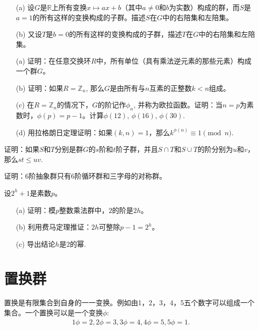 \begin{problemset}
\item \begin{enumerate}
\item[(a)] 设$G$是$\mathbb{R}$上所有变换$x \mapsto ax+b$（其中$a \neq 0$和$b$为实数）构成的群，而$S$是$a=1$的所有这样的变换构成的子群。描述$S$在$G$中的右陪集和左陪集。
\item[(b)] 又设$T$是$b=0$的所有这样的变换构成的子群，描述$T$在$G$中的右陪集和左陪集。
\end{enumerate}

\item \begin{enumerate}
\item[(a)] 证明：在任意交换环$R$中，所有单位（具有乘法逆元素的那些元素）构成一个群$G$。
\item[(b)] 证明：如果$R = \mathbb{Z}_n$, 那么$G$是由所有与$n$互素的正整数$k < n$组成。
\item[(c)] 在$R = \mathbb{Z}_n$的情况下，$G$的阶记作$\phi_n$, 并称为欧拉函数。证明：当$n=p$为素数时，$\phi(p)=p-1$。计算$\phi(12)$, $\phi(16)$, $\phi(30)$.
\item[(d)] 用拉格朗日定理证明：如果$(k, n)=1$，那么$k^{\phi(n)} \equiv 1 \pmod{n}$.
\end{enumerate}

\item 证明：如果$S$和$T$分别是群$G$的$s$阶和$t$阶子群，并且$S \cap T$和$S \cup T$的阶分别为$u$和$v$，那么$st \le uv$.

\item 证明：6阶抽象群只有6阶循环群和三字母的对称群。

\item 设$2^h+1$是素数$p$。
\begin{enumerate}
\item[(a)] 证明：模$p$整数乘法群中，$2$的阶是$2h$。
\item[(b)] 利用费马定理推证：$2h$可整除$p-1=2^h$。
\item[(c)] 导出结论$h$是$2$的幂.
\end{enumerate}

\end{problemset}



\section{置换群}\label{section0010609}
置换是有限集合到自身的一一变换。例如由1，2，3，4，5五个数字可以组成一个集合。一个置换可以是一个变换$\phi$:
\begin{gather}\label{equ001060910}
1\phi=2, 2\phi=3, 3\phi=4, 4\phi=5, 5\phi=1.
\end{gather}

